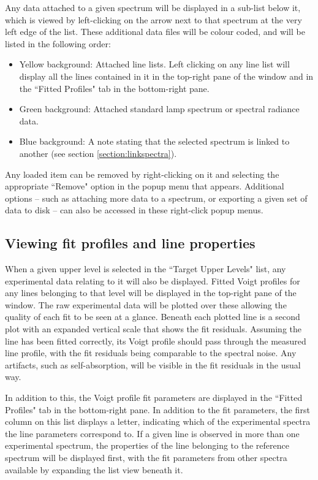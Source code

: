 \documentclass[a4paper,12pt]{report}
\begin{document}
Any data attached to a given spectrum will be displayed in a sub-list below it, which is viewed by left-clicking on the arrow next to that spectrum at the very left edge of the list. These additional data files will be colour coded, and will be listed in the following order:

\begin{itemize}
\item \colorbox{attached_line_list}{Yellow background}: Attached line lists. Left clicking on any line list will display all the lines contained in it in the top-right pane of the window and in the ``Fitted Profiles" tab in the bottom-right pane.
\item \colorbox{attached_std_lamp}{Green background}: Attached standard lamp spectrum or spectral radiance data.
\item \colorbox{attached_link}{Blue background}: A note stating that the selected spectrum is linked to another (see section \ref{section:linkspectra}).
\end{itemize}

Any loaded item can be removed by right-clicking on it and selecting the appropriate ``Remove" option in the popup menu that appears. Additional options -- such as attaching more data to a spectrum, or exporting a given set of data to disk -- can also be accessed in these right-click popup menus.

\subsection{Viewing fit profiles and line properties}
When a given upper level is selected in the ``Target Upper Levels" list, any experimental data relating to it will also be displayed. Fitted Voigt profiles for any lines belonging to that level will be displayed in the top-right pane of the window. The raw experimental data will be plotted over these allowing the quality of each fit to be seen at a glance. Beneath each plotted line is a second plot with an expanded vertical scale that shows the fit residuals. Assuming the line has been fitted correctly, its Voigt profile should pass through the measured line profile, with the fit residuals being comparable to the spectral noise. Any artifacts, such as self-absorption, will be visible in the fit residuals in the usual way.

In addition to this, the Voigt profile fit parameters are displayed in the ``Fitted Profiles" tab in the bottom-right pane. In addition to the fit parameters, the first column on this list displays a letter, indicating which of the experimental spectra the line parameters correspond to. If a given line is observed in more than one experimental spectrum, the properties of the line belonging to the reference spectrum will be displayed first, with the fit parameters from other spectra available by expanding the list view beneath it.
\end{document}
